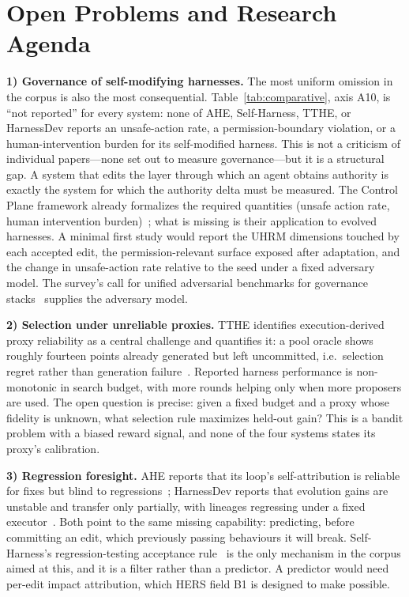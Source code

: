 \documentclass[conference]{IEEEtran}
\begin{document}
\section{Open Problems and Research Agenda}
\label{sec:open}

\textbf{1) Governance of self-modifying harnesses.} The most uniform omission in the corpus is also the most consequential. Table~\ref{tab:comparative}, axis A10, is ``not reported'' for every system: none of AHE, Self-Harness, TTHE, or HarnessDev reports an unsafe-action rate, a permission-boundary violation, or a human-intervention burden for its self-modified harness. This is not a criticism of individual papers---none set out to measure governance---but it is a structural gap. A system that edits the layer through which an agent obtains authority is exactly the system for which the authority delta must be measured. The Control Plane framework already formalizes the required quantities (unsafe action rate, human intervention burden)~\cite{b7}; what is missing is their application to evolved harnesses. A minimal first study would report the UHRM dimensions touched by each accepted edit, the permission-relevant surface exposed after adaptation, and the change in unsafe-action rate relative to the seed under a fixed adversary model. The survey's call for unified adversarial benchmarks for governance stacks~\cite{b2} supplies the adversary model.

\textbf{2) Selection under unreliable proxies.} TTHE identifies execution-derived proxy reliability as a central challenge and quantifies it: a pool oracle shows roughly fourteen points already generated but left uncommitted, i.e.\ selection regret rather than generation failure~\cite{b5}. Reported harness performance is non-monotonic in search budget, with more rounds helping only when more proposers are used. The open question is precise: given a fixed budget and a proxy whose fidelity is unknown, what selection rule maximizes held-out gain? This is a bandit problem with a biased reward signal, and none of the four systems states its proxy's calibration.

\textbf{3) Regression foresight.} AHE reports that its loop's self-attribution is reliable for fixes but blind to regressions~\cite{b3}; HarnessDev reports that evolution gains are unstable and transfer only partially, with lineages regressing under a fixed executor~\cite{b6}. Both point to the same missing capability: predicting, before committing an edit, which previously passing behaviours it will break. Self-Harness's regression-testing acceptance rule~\cite{b4} is the only mechanism in the corpus aimed at this, and it is a filter rather than a predictor. A predictor would need per-edit impact attribution, which HERS field B1 is designed to make possible.
\end{document}
